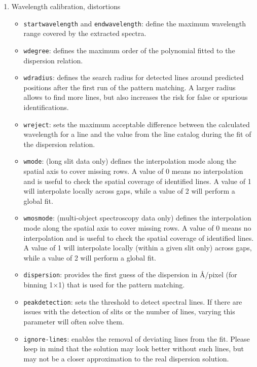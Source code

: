\begin{enumerate}
\begin{itemize}
\end{itemize}


\item Wavelength calibration, distortions

\begin{itemize}
\item {\tt startwavelength} and {\tt endwavelength}: define the maximum 
wavelength range covered by the extracted spectra.

\item {\tt wdegree}: defines the maximum order of the polynomial fitted to the dispersion relation.
\item {\tt wdradius}: defines the search radius for detected lines around predicted positions after the first run of the pattern matching. A larger radius allows to find more lines, but also increases the risk for false
or spurious identifications.

\item {\tt wreject}: sets the maximum acceptable difference between the calculated wavelength for a line and the value from the line catalog during the fit of the dispersion relation.

\item {\tt wmode}: (long slit data only) defines the interpolation mode along the spatial axis to cover missing rows. A value of 0 means no interpolation and is useful to check the spatial coverage of identified
lines. A value of 1 will interpolate locally across gaps, while a value of 2 will perform a global fit.

\item {\tt wmosmode}: (multi-object spectroscopy data only) defines the interpolation mode along the spatial axis to cover missing rows. A value of 0 means no interpolation and is useful to check the spatial coverage of identified lines. A value of 1 will interpolate locally (within a given slit only) across gaps, while a value of 2 will perform a global fit.

\item {\tt dispersion}: provides the first guess of the dispersion in Å/pixel (for binning 1×1) that is used for the pattern matching.

\item {\tt peakdetection}: sets the threshold to detect spectral lines. If there are issues with the detection of slits or the number of lines, varying this parameter will often solve them.

\item {\tt ignore-lines}: enables the removal of deviating lines from the fit. Please keep in mind that the solution may look better without such lines, but may not be a closer approximation to the real dispersion solution.


\end{itemize}
\end{enumerate}
